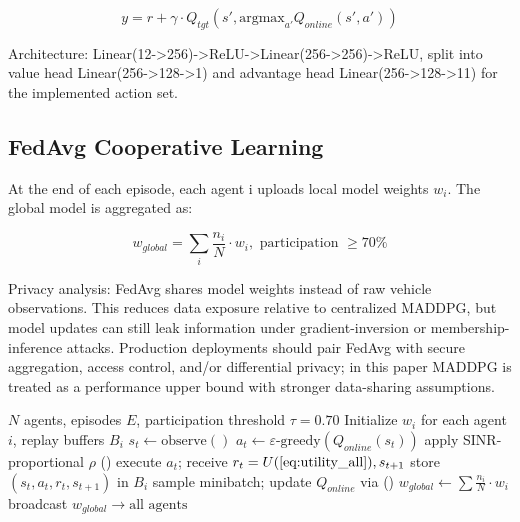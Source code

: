 \begin{equation}
\label{eq:ddqn}
y = r + \gamma \cdot Q_{tgt}(s', \text{argmax}_{a'} Q_{online}(s', a'))
\end{equation}

Architecture: Linear(12->256)->ReLU->Linear(256->256)->ReLU, split into value head Linear(256->128->1) and advantage head Linear(256->128->11) for the implemented action set.

\subsection{FedAvg Cooperative Learning}

At the end of each episode, each agent i uploads local model weights $w_i$. The global model is aggregated as:

\begin{equation}
\label{eq:fedavg}
w_{global} = \sum_i \frac{n_i}{N} \cdot w_i, \text{ participation } \geq 70\%
\end{equation}

Privacy analysis: FedAvg shares model weights instead of raw vehicle observations. This reduces data exposure relative to centralized MADDPG, but model updates can still leak information under gradient-inversion or membership-inference attacks. Production deployments should pair FedAvg with secure aggregation, access control, and/or differential privacy; in this paper MADDPG is treated as a performance upper bound with stronger data-sharing assumptions.

\begin{algorithm}[htbp]
\caption{MA-ROPE Training with FedAvg}
\label{alg:ma_rope}
\begin{algorithmic}[1]
\REQUIRE $N$ agents, episodes $E$, participation threshold $\tau=0.70$
\STATE Initialize $w_i$ for each agent $i$, replay buffers $B_i$
        \STATE $s_t \leftarrow \text{observe}()$ 
        \STATE $a_t \leftarrow \varepsilon\text{-greedy}(Q_{online}(s_t))$
        \STATE apply SINR-proportional $\rho$ ()
        \STATE execute $a_t$; receive $r_t = U (\text{\Cref{eq:utility_all}}), s_{t+1}$
        \STATE store $(s_t, a_t, r_t, s_{t+1})$ in $B_i$
        \STATE sample minibatch; update $Q_{online}$ via ()
    \ENDFOR
        \STATE $w_{global} \leftarrow \sum \frac{n_i}{N} \cdot w_i$ 
        \STATE broadcast $w_{global} \rightarrow \text{all agents}$
    \ENDIF
\ENDFOR
\end{algorithmic}
\end{algorithm}
